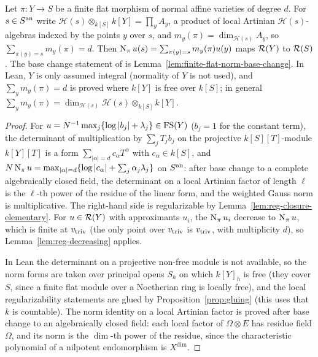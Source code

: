 \begin{lemma}\label{lem:finite-flat-norm}
\leanok
{}
Let $\pi\colon Y\to S$ be a finite flat morphism of normal affine varieties of degree $d$. For
$s\in S^{\mathrm{an}}$ write $\mathcal H(s)\otimes_{k[S]}k[Y]=\prod_yA_y$, a product of local Artinian
$\mathcal H(s)$-algebras indexed by the points $y$ over $s$, and $m_y(\pi)=\dim_{\mathcal H(s)}A_y$,
so $\sum_{\pi(y)=s}m_y(\pi)=d$. Then $\operatorname{N}_\pi u(s)=\sum_{\pi(y)=s}m_y(\pi)u(y)$ maps $\mathcal{R}(Y)$ to
$\mathcal{R}(S)$. The base change statement of \cite[Lemma~5.13]{FHX} is Lemma~\ref{lem:finite-flat-norm-base-change}.
In Lean, $Y$ is only assumed integral (normality of $Y$ is not used), and $\sum_ym_y(\pi)=d$ is proved where
$k[Y]$ is free over $k[S]$; in general $\sum_ym_y(\pi)=\dim_{\mathcal H(s)}\mathcal H(s)\otimes_{k[S]}k[Y]$.
\end{lemma}

\begin{proof}
For $u=N^{-1}\max_j\{\log|b_j|+\lambda_j\}\in\mathrm{FS}(Y)$ ($b_j=1$ for the constant term), the
determinant of multiplication by $\sum_jT_jb_j$ on the projective $k[S][T]$-module $k[Y][T]$ is a
form $\sum_{|\alpha|=d}c_\alpha T^\alpha$ with $c_\alpha\in k[S]$, and
$N\operatorname{N}_\pi u=\max_{|\alpha|=d}\{\log|c_\alpha|+\sum_j\alpha_j\lambda_j\}$ on $S^{\mathrm{an}}$: after base change to
a complete algebraically closed field, the determinant on a local Artinian factor of length $\ell$ is
the $\ell$-th power of the residue of the linear form, and the weighted Gauss norm is
multiplicative. The right-hand side is regularizable by Lemma~\ref{lem:reg-closure-elementary}. For
$u\in\mathcal{R}(Y)$ with approximants $u_i$, the $\operatorname{N}_\pi u_i$ decrease to $\operatorname{N}_\pi u$, which is finite
at $v_{\mathrm{triv}}$ (the only point over $v_{\mathrm{triv}}$ is $v_{\mathrm{triv}}$, with multiplicity $d$), so
Lemma~\ref{lem:reg-decreasing} applies.

In Lean the determinant on a projective non-free module is not available, so the norm forms are taken
over principal opens $S_h$ on which $k[Y]_h$ is free (they cover $S$, since a finite flat module over a
Noetherian ring is locally free), and the local regularizability statements are glued by
Proposition~\ref{prop:gluing} (this uses that $k$ is countable). The norm identity on a local Artinian factor
is proved after base change to an algebraically closed field: each local factor of $\Omega\otimes E$ has residue
field $\Omega$, and its norm is the $\dim$-th power of the residue, since the characteristic polynomial of a
nilpotent endomorphism is $X^{\dim}$.
\end{proof}

